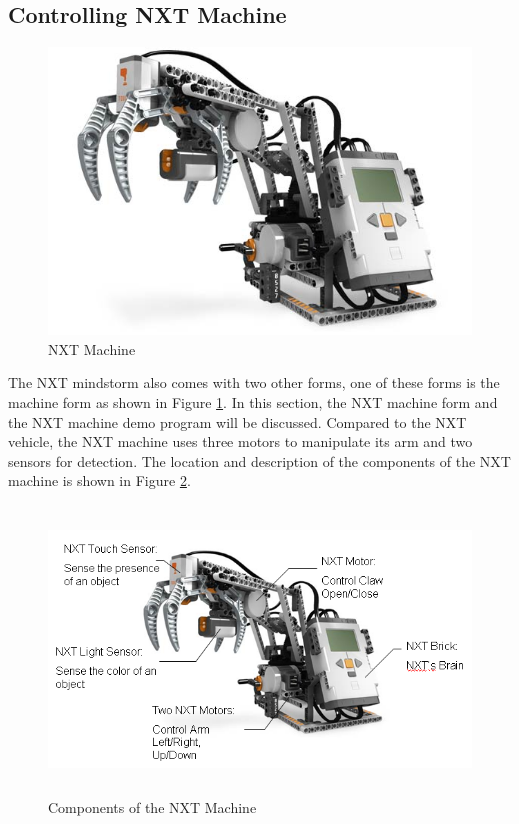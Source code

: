 \documentclass[12pt]{article}
\begin{document}
\subsection{Controlling NXT Machine}
\begin{figure}[h]
  \begin{center}
    \includegraphics[height=3in]{figure/mindstorm/NXT_machine.png}
    \caption{NXT Machine\label{fig_NXT_machine}}
  \end{center}
\end{figure}
\noindent
The NXT mindstorm also comes with two other forms, one of these forms is the machine form as shown in Figure
    \ref{fig_NXT_machine}.
In this section, the NXT machine form and the NXT machine demo program will be discussed.
Compared to the NXT vehicle, the NXT machine uses three motors to manipulate its arm and two sensors for detection.
The location and description of the components of the NXT machine is shown in Figure \ref{fig_NXT_machineMOD}.
\newpage
\begin{figure}[h]
  \begin{center}
    \includegraphics[height=3in]{figure/mindstorm/NXT_machineMOD.png}
    \caption{Components of the NXT Machine\label{fig_NXT_machineMOD}}
  \end{center}
\end{figure}
\end{document}
